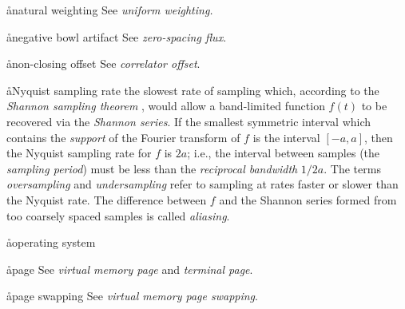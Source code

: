 \aa{natural weighting} See {\it uniform weighting.}

\aa{negative bowl artifact} See {\it zero-spacing flux}.

\aa{non-closing offset} See {\it correlator offset}.

\aa{Nyquist sampling rate}
the slowest rate of sampling which, according to the {\it Shannon
sampling theorem} \qv, would allow a band-limited function $f(t)$ to
be recovered via the {\it Shannon series}.
If the smallest symmetric interval which contains the {\it support} of
the Fourier transform of $f$ is the interval $[-a,a]$, then
the Nyquist sampling rate for $f$ is $2a$; i.e., the
interval between samples (the {\sl sampling period}\/)
must be less than the {\sl reciprocal bandwidth} $1/2a$.
The terms {\sl oversampling} and {\sl undersampling}
refer to sampling at rates faster or slower than the Nyquist rate.
The difference between $f$ and the Shannon series formed
from too coarsely spaced samples is called {\it aliasing}.

\aa{operating system}

\aa{page} See {\it virtual memory page} and {\it terminal page}.

\aa{page swapping} See {\it virtual memory page swapping}.


